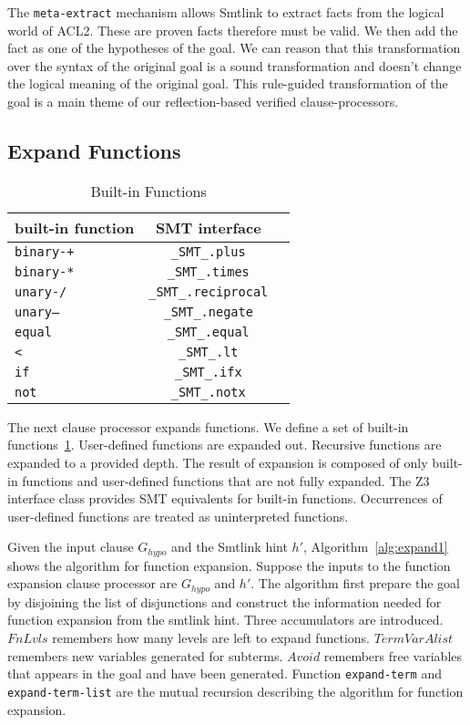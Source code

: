 The \texttt{meta-extract} mechanism allows Smtlink to extract facts from the
logical world of ACL2. These are proven facts therefore must be valid. We then
add the fact as one of the hypotheses of the goal. We can reason that this
transformation over the syntax of the original goal is a sound transformation
and doesn't change the logical meaning of the original goal. This rule-guided
transformation of the goal is a main theme of our reflection-based verified
clause-processors. 

\subsection{Expand Functions}

\begin{table}[h!]
  \begin{center}
    \caption{Built-in Functions}
    \label{tb:builtin}
    \begin{tabular}{|l|c|r|}
      \textbf{built-in function} & \textbf{SMT interface}\\
      \hline
      \texttt{binary-+} & \texttt{\_SMT\_.plus}\\
      \texttt{binary-*} & \texttt{\_SMT\_.times}\\
      \texttt{unary-/} & \texttt{\_SMT\_.reciprocal}\\
      \texttt{unary--} & \texttt{\_SMT\_.negate}\\
      \texttt{equal} & \texttt{\_SMT\_.equal}\\
      \texttt{<} & \texttt{\_SMT\_.lt}\\
      \texttt{if} & \texttt{\_SMT\_.ifx}\\
      \texttt{not} & \texttt{\_SMT\_.notx}\\
    \end{tabular}
  \end{center}
\end{table}

The next clause processor expands functions.
We define a set of built-in functions~\ref{tb:builtin}. User-defined functions
are expanded out. Recursive functions are expanded to a provided depth. The
result of expansion is composed of only built-in functions and user-defined
functions that are not fully expanded.
The Z3 interface class provides SMT equivalents for built-in functions.
Occurrences of user-defined functions are treated as uninterpreted functions.

Given the input clause $G_{hypo}$ and the Smtlink hint $h'$,
Algorithm~\ref{alg:expand1} shows the algorithm for function expansion. Suppose
the inputs to the function expansion clause processor are $G_{hypo}$ and $h'$.
The algorithm first prepare the goal by disjoining the list of disjunctions and
construct the information needed for function expansion from the smtlink hint.
Three accumulators are introduced. $FnLvls$ remembers how many levels are left
to expand functions. $TermVarAlist$ remembers new variables generated for
subterms. $Avoid$ remembers free variables that appears in the goal and have
been generated. Function \texttt{expand-term} and \texttt{expand-term-list} are
the mutual recursion describing the algorithm for function expansion.

